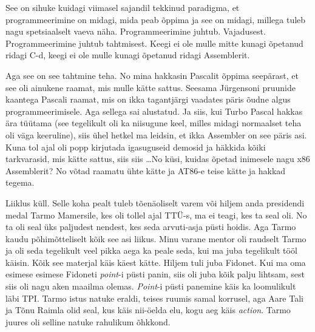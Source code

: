 
See on sihuke  kuidagi viimasel sajandil tekkinud paradigma, et 
programmeerimine on midagi, mida peab õppima ja see on midagi, millega tuleb 
nagu spetsiaalselt vaeva näha. Programmeerimine juhtub. Vajadusest. 
Programmeerimine juhtub tahtmisest. Keegi ei ole mulle mitte kunagi õpetanud 
ridagi C-d, keegi ei ole mulle kunagi õpetanud ridagi Assemblerit. 


Aga see on see tahtmine teha. No mina hakkasin  
Pascalit õppima seepärast, et see oli ainukene raamat, mis 
mulle kätte sattus. Seesama Jürgensoni pruunide kaantega Pascali  
raamat, mis on ikka tagantjärgi vaadates 
päris õudne algus programmeerimisele. Aga sellega sai alustatud. Ja siis, kui 
Turbo Pascal hakkas ära tüütama (see tegelikult oli ka niisugune 
keel, milles midagi normaalset teha oli väga keeruline), siis ühel hetkel ma 
leidsin, et ikka Assembler on see päris asi. Kuna tol 
ajal oli popp kirjutada igasuguseid demosid ja häkkida kõiki tarkvarasid, mis 
kätte sattus, siis siis \ldots No küsi, kuidas õpetad inimesele nagu x86 
Assemblerit? No võtad raamatu ühte kätte ja AT86-e teise kätte ja hakkad tegema.


Liiklus küll. Selle koha pealt tuleb tõenäoliselt varem või hiljem anda
presidendi medal Tarmo Mamersile, kes oli tollel ajal 
TTÜ-s, ma ei teagi, kes ta seal oli. No ta oli 
seal üks paljudest nendest, kes seda arvuti-asja püsti hoidis. Aga 
Tarmo kaudu põhimõtteliselt kõik see asi liikus. Minu varane mentor oli 
raudselt Tarmo ja oli seda tegelikult veel pikka aega ka peale seda, kui ma 
juba tegelikult tööl käisin. Kõik see materjal käis käest kätte. Hiljem tuli 
juba Fidonet. Kui ma oma esimese esimese Fidoneti \emph{point}-i 
püsti panin, siis oli juba kõik palju lihtsam, sest siis oli nagu aken maailma 
olemas. \emph{Point}-i püsti panemine käis ka loomulikult läbi TPI. Tarmo 
istus natuke eraldi, teises ruumis samal korrusel, aga  
Aare Tali\label{sisu!aare_tali} ja Tõnu 
Raimla olid 
seal, kus käis nii-öelda elu, kogu aeg käis \emph{action}. Tarmo juures oli 
selline natuke rahulikum 
õhkkond. 

